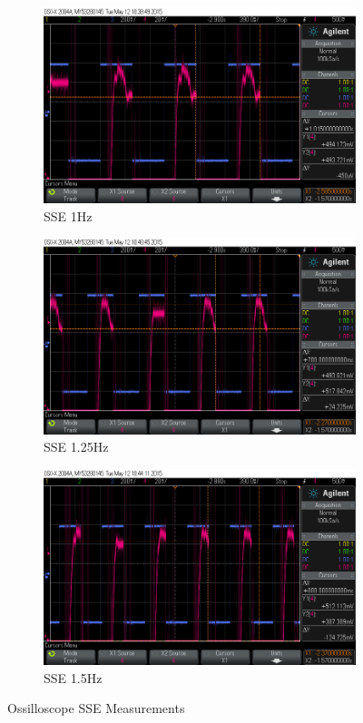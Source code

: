 \documentclass[11pt,a4paper]{article}
\begin{document}
\begin{enumerate}
\begin{figure}[H]
  \begin{subfigure}{0.5\textwidth}
  \includegraphics[width=0.95\linewidth]{Ossilloscope/PartD_1_0Hz_SSE.png}
  \caption{SSE 1Hz}
  \label{fig:subim2}
  \end{subfigure}
  \begin{subfigure}{0.5\textwidth}
  \includegraphics[width=0.95\linewidth]{Ossilloscope/PartD_1_25Hz_SSE.png}
  \caption{SSE 1.25Hz}
  \label{fig:subim2}
  \end{subfigure}

  \begin{subfigure}{0.5\textwidth}
  \includegraphics[width=0.95\linewidth]{Ossilloscope/PartD_1_50Hz_SSE.png}
  \caption{SSE 1.5Hz}
  \label{fig:subim2}
  \end{subfigure}
\caption{\label{fig:freqimpact}Ossilloscope SSE Measurements}
\end{figure}


\end{enumerate}
\end{document}
